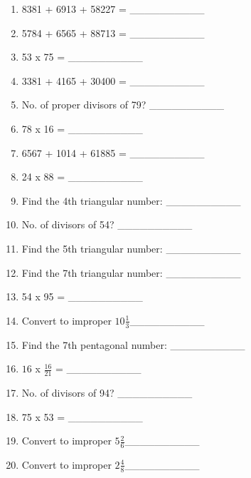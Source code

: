 \documentclass{article}
\begin{document}
\begin{multicols}{2}
\begin{enumerate}
\item 8381 + 6913 + 58227 = \_\_\_\_\_\_\_\_\_\_ \\ 
\item 5784 + 6565 + 88713 = \_\_\_\_\_\_\_\_\_\_ \\ 
\item 53 x 75 = \_\_\_\_\_\_\_\_\_\_ \\ 
\item 3381 + 4165 + 30400 = \_\_\_\_\_\_\_\_\_\_ \\ 
\item No. of proper divisors of 79? \_\_\_\_\_\_\_\_\_\_ \\ 
\item 78 x 16 = \_\_\_\_\_\_\_\_\_\_ \\ 
\item 6567 + 1014 + 61885 = \_\_\_\_\_\_\_\_\_\_ \\ 
\item 24 x 88 = \_\_\_\_\_\_\_\_\_\_ \\ 
\item Find the 4th triangular number:  \_\_\_\_\_\_\_\_\_\_ \\ 
\item No. of divisors of 54? \_\_\_\_\_\_\_\_\_\_ \\ 
\item Find the 5th triangular number:  \_\_\_\_\_\_\_\_\_\_ \\ 
\item Find the 7th triangular number:  \_\_\_\_\_\_\_\_\_\_ \\ 
\item 54 x 95 = \_\_\_\_\_\_\_\_\_\_ \\ 
\item Convert to improper $10\frac{1}{3}$\_\_\_\_\_\_\_\_\_\_ \\ 
\item Find the 7th pentagonal number:  \_\_\_\_\_\_\_\_\_\_ \\ 
\item $16$ x $\frac{16}{21}$ = \_\_\_\_\_\_\_\_\_\_ \\ 
\item No. of divisors of 94? \_\_\_\_\_\_\_\_\_\_ \\ 
\item 75 x 53 = \_\_\_\_\_\_\_\_\_\_ \\ 
\item Convert to improper $5\frac{2}{6}$\_\_\_\_\_\_\_\_\_\_ \\ 
\item Convert to improper $2\frac{4}{8}$\_\_\_\_\_\_\_\_\_\_ \\ 

\end{enumerate}
\end{multicols}
\end{document}
